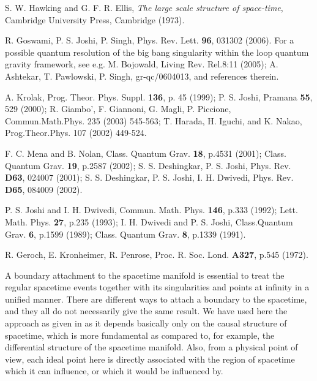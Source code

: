 \documentclass[twocolumn,aps,amsmath,amssymb,prl,showpacs,preprintnumbers]
{revtex4}
\begin{document}
\begin{thebibliography}{99}

 S. W. Hawking and G. F. R. Ellis, {\it The large scale
structure of space-time}, Cambridge University Press, Cambridge (1973).


 R. Goswami, P. S. Joshi, P. Singh, Phys. Rev. Lett. 
{\bf96}, 031302 (2006). For a possible quantum resolution of the 
big bang singularity within the loop quantum gravity framework, see
e.g. M. Bojowald,  Living Rev. Rel.8:11 (2005); A. Ashtekar, 
T. Pawlowski, P. Singh, gr-qc/0604013, and references therein. 


 A. Krolak, Prog. Theor. Phys. Suppl. {\bf 136}, p. 45 (1999);
P. S. Joshi, Pramana {\bf 55}, 529 (2000); R. Giambo', F. Giannoni, G. Magli, P.
Piccione, Commun.Math.Phys. 235 (2003) 545-563; T. Harada, H. Iguchi,
and K. Nakao, Prog.Theor.Phys. 107 (2002) 449-524.


 F. C. Mena and B. Nolan, Class. Quantum Grav. {\bf18}, 
p.4531 (2001);  Class. Quantum Grav. {\bf19},
p.2587 (2002);  S. S. Deshingkar, P. S. Joshi, Phys. Rev. {\bf D63}, 024007
(2001); S. S. Deshingkar, P. S. Joshi, I. H. Dwivedi, Phys. Rev. 
{\bf D65}, 084009 (2002).


P. S. Joshi and I. H. Dwivedi, Commun. Math. Phys. {\bf146}, p.333 (1992);
Lett. Math. Phys. {\bf27}, p.235 (1993); I. H. Dwivedi and P. S. Joshi, 
Class.Quantum Grav. {\bf 6}, p.1599 (1989); Class. Quantum Grav. {\bf8}, p.1339 (1991). 



 R. Geroch, E. Kronheimer, R. Penrose, Proc. R. Soc.
Lond. {\bf A327}, p.545 (1972).


 A boundary attachment to the spacetime manifold is
essential to treat the regular spacetime events together with its
singularities and points at infinity in a unified manner. There are
different ways to attach a boundary to the spacetime, and they all
do not necessarily give the same result. We have used here 
the approach as given in
\cite{geroch} 
as it depends basically only on the causal 
structure of spacetime, which is more fundamental as compared to, 
for example, the differential structure of the spacetime manifold.  
Also, from a physical point of view, each ideal point here is
directly associated with the region of spacetime which it can 
influence, or which it would be influenced by.







\end{thebibliography}
\end{document}
